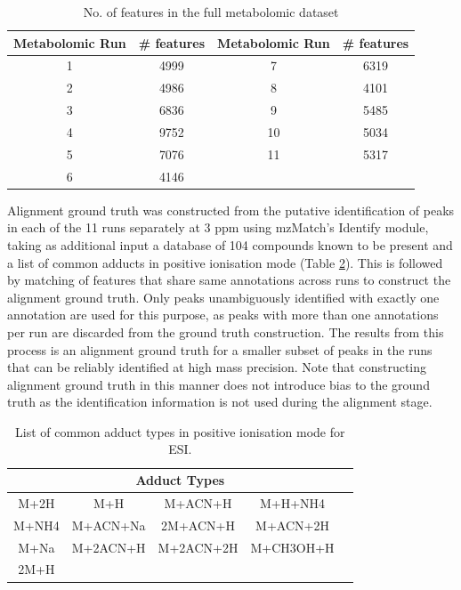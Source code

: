 \begin{table}[!htbp]
\noindent \begin{centering}
\begin{tabular}{|c|c|c|c|}
\hline 
\textbf{Metabolomic Run} & \textbf{\# features} & \textbf{Metabolomic Run} & \textbf{\# features}\tabularnewline
\hline 
\hline 
1 & 4999 & 7 & 6319\tabularnewline
\hline 
2 & 4986 & 8 & 4101\tabularnewline
\hline 
3 & 6836 & 9 & 5485\tabularnewline
\hline 
4 & 9752 & 10 & 5034\tabularnewline
\hline 
5 & 7076 & 11 & 5317\tabularnewline
\hline 
6 & 4146 &  & \tabularnewline
\hline 
\end{tabular}
\par\end{centering}

\caption{No. of features in the full metabolomic dataset\label{tab:No.-of-features-metabolomic}}
\end{table}

Alignment ground truth was constructed from the putative identification of peaks in each of the 11 runs separately at 3 ppm using mzMatch's Identify module, taking as additional input a database of 104 compounds known to be present and a list of common adducts in positive ionisation mode (Table \ref{tab:adducts}). This is followed by matching of features that share same annotations across runs to construct the alignment ground truth. Only peaks unambiguously identified with exactly one annotation are used for this purpose, as peaks with more than one annotations per run are discarded from the ground truth construction. The results from this process is an alignment ground truth for a smaller subset of peaks in the runs that can be reliably identified at high mass precision. Note that constructing alignment ground truth in this manner does not introduce bias to the ground truth as the identification information is not used during the alignment stage.

\begin{table}[!htbp]
\begin{centering}
\begin{tabular}{|ccccc|}
\hline 
\multicolumn{5}{|c|}{{\footnotesize{}Adduct Types}}\tabularnewline
\hline 
\hline 
{\footnotesize{}M+2H} & {\footnotesize{}M+H} & {\footnotesize{}M+ACN+H} & {\footnotesize{}M+H+NH4} & \tabularnewline
{\footnotesize{}M+NH4} & {\footnotesize{}M+ACN+Na} & {\footnotesize{}2M+ACN+H} & {\footnotesize{}M+ACN+2H} & \tabularnewline
{\footnotesize{}M+Na} & {\footnotesize{}M+2ACN+H} & {\footnotesize{}M+2ACN+2H} & {\footnotesize{}M+CH3OH+H} & \tabularnewline
{\footnotesize{}2M+H} &  &  &  & \tabularnewline
\hline 
\end{tabular}
\par\end{centering}
\caption{List of common adduct types in positive ionisation mode for ESI.\label{tab:adducts}}
\end{table}

